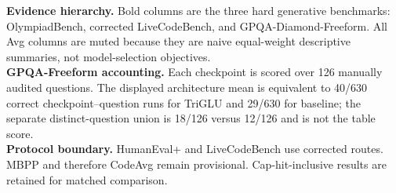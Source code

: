 \par\vspace{4pt}
\begin{minipage}{\linewidth}\footnotesize
\textbf{Evidence hierarchy.} Bold columns are the three hard generative benchmarks: OlympiadBench, corrected LiveCodeBench, and GPQA-Diamond-Freeform. All Avg columns are muted because they are naive equal-weight descriptive summaries, not model-selection objectives.\\
\textbf{GPQA-Freeform accounting.} Each checkpoint is scored over 126 manually audited questions. The displayed architecture mean is equivalent to 40/630 correct checkpoint--question runs for TriGLU and 29/630 for baseline; the separate distinct-question union is 18/126 versus 12/126 and is not the table score.\\
\textbf{Protocol boundary.} HumanEval+ and LiveCodeBench use corrected routes. MBPP and therefore CodeAvg remain provisional. Cap-hit-inclusive results are retained for matched comparison.
\end{minipage}
\endgroup
